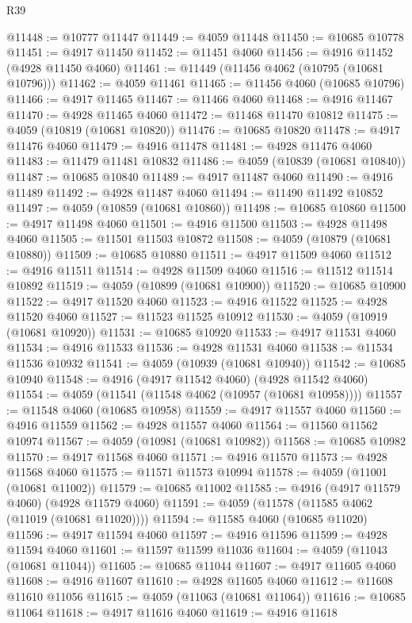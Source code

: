 \begin{lexlean}{R39}
\begin{coremodule}
@11448 := @10777 @11447
@11449 := @4059 @11448
@11450 := @10685 @10778
@11451 := @4917 @11450
@11452 := @11451 @4060
@11456 := @4916 @11452 (@4928 @11450 @4060)
@11461 := @11449 (@11456 @4062 (@10795 (@10681 @10796)))
@11462 := @4059 @11461
@11465 := @11456 @4060 (@10685 @10796)
@11466 := @4917 @11465
@11467 := @11466 @4060
@11468 := @4916 @11467
@11470 := @4928 @11465 @4060
@11472 := @11468 @11470 @10812
@11475 := @4059 (@10819 (@10681 @10820))
@11476 := @10685 @10820
@11478 := @4917 @11476 @4060
@11479 := @4916 @11478
@11481 := @4928 @11476 @4060
@11483 := @11479 @11481 @10832
@11486 := @4059 (@10839 (@10681 @10840))
@11487 := @10685 @10840
@11489 := @4917 @11487 @4060
@11490 := @4916 @11489
@11492 := @4928 @11487 @4060
@11494 := @11490 @11492 @10852
@11497 := @4059 (@10859 (@10681 @10860))
@11498 := @10685 @10860
@11500 := @4917 @11498 @4060
@11501 := @4916 @11500
@11503 := @4928 @11498 @4060
@11505 := @11501 @11503 @10872
@11508 := @4059 (@10879 (@10681 @10880))
@11509 := @10685 @10880
@11511 := @4917 @11509 @4060
@11512 := @4916 @11511
@11514 := @4928 @11509 @4060
@11516 := @11512 @11514 @10892
@11519 := @4059 (@10899 (@10681 @10900))
@11520 := @10685 @10900
@11522 := @4917 @11520 @4060
@11523 := @4916 @11522
@11525 := @4928 @11520 @4060
@11527 := @11523 @11525 @10912
@11530 := @4059 (@10919 (@10681 @10920))
@11531 := @10685 @10920
@11533 := @4917 @11531 @4060
@11534 := @4916 @11533
@11536 := @4928 @11531 @4060
@11538 := @11534 @11536 @10932
@11541 := @4059 (@10939 (@10681 @10940))
@11542 := @10685 @10940
@11548 := @4916 (@4917 @11542 @4060) (@4928 @11542 @4060)
@11554 := @4059 (@11541 (@11548 @4062 (@10957 (@10681 @10958))))
@11557 := @11548 @4060 (@10685 @10958)
@11559 := @4917 @11557 @4060
@11560 := @4916 @11559
@11562 := @4928 @11557 @4060
@11564 := @11560 @11562 @10974
@11567 := @4059 (@10981 (@10681 @10982))
@11568 := @10685 @10982
@11570 := @4917 @11568 @4060
@11571 := @4916 @11570
@11573 := @4928 @11568 @4060
@11575 := @11571 @11573 @10994
@11578 := @4059 (@11001 (@10681 @11002))
@11579 := @10685 @11002
@11585 := @4916 (@4917 @11579 @4060) (@4928 @11579 @4060)
@11591 := @4059 (@11578 (@11585 @4062 (@11019 (@10681 @11020))))
@11594 := @11585 @4060 (@10685 @11020)
@11596 := @4917 @11594 @4060
@11597 := @4916 @11596
@11599 := @4928 @11594 @4060
@11601 := @11597 @11599 @11036
@11604 := @4059 (@11043 (@10681 @11044))
@11605 := @10685 @11044
@11607 := @4917 @11605 @4060
@11608 := @4916 @11607
@11610 := @4928 @11605 @4060
@11612 := @11608 @11610 @11056
@11615 := @4059 (@11063 (@10681 @11064))
@11616 := @10685 @11064
@11618 := @4917 @11616 @4060
@11619 := @4916 @11618

\end{coremodule}
\end{lexlean}
